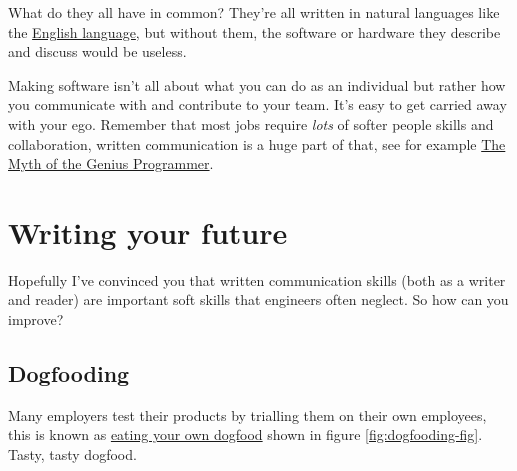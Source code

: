 \documentclass[
]{book}
\begin{document}
What do they all have in common? They're all written in natural languages like the \href{https://en.wikipedia.org/wiki/English_language}{English language}, but without them, the software or hardware they describe and discuss would be useless.

Making software isn't all about what you can do as an individual but rather how you communicate with and contribute to your team. It's easy to get carried away with your ego. Remember that most jobs require \emph{lots} of softer people skills and collaboration, written communication is a huge part of that, see for example \href{https://www.youtube.com/watch?v=0SARbwvhupQ}{The Myth of the Genius Programmer}. \citep{Fitzpatrick}

\hypertarget{wyf}{%
\section{Writing your future}\label{wyf}}

Hopefully I've convinced you that written communication skills (both as a writer and reader) are important soft skills that engineers often neglect. So how can you improve?

\hypertarget{dogfooding}{%
\subsection{Dogfooding}\label{dogfooding}}

Many employers test their products by trialling them on their own employees, this is known as \href{https://en.wikipedia.org/wiki/Eating_your_own_dog_food}{eating your own dogfood} shown in figure \ref{fig:dogfooding-fig}. Tasty, tasty dogfood. 🐶
\end{document}
